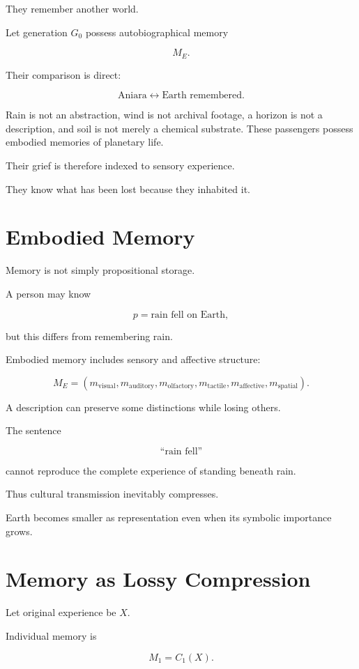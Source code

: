 \documentclass[11pt,oneside]{book}
\theoremstyle{definition}
\theoremstyle{remark}
\begin{document}
They remember another world.

Let generation \(G_0\) possess autobiographical memory

\[
M_E.
\]

Their comparison is direct:

\[
\text{Aniara}
\leftrightarrow
\text{Earth remembered}.
\]

Rain is not an abstraction, wind is not archival footage, a horizon is not a description, and soil is not merely a chemical substrate. These passengers possess embodied memories of planetary life.

Their grief is therefore indexed to sensory experience.

They know what has been lost because they inhabited it.

\section{Embodied Memory}

Memory is not simply propositional storage.

A person may know

\[
p=\text{rain fell on Earth},
\]

but this differs from remembering rain.

Embodied memory includes sensory and affective structure:

\[
M_E
=
(
m_{\mathrm{visual}},
m_{\mathrm{auditory}},
m_{\mathrm{olfactory}},
m_{\mathrm{tactile}},
m_{\mathrm{affective}},
m_{\mathrm{spatial}}
).
\]

A description can preserve some distinctions while losing others.

The sentence

\[
\text{``rain fell''}
\]

cannot reproduce the complete experience of standing beneath rain.

Thus cultural transmission inevitably compresses.

Earth becomes smaller as representation even when its symbolic importance grows.

\section{Memory as Lossy Compression}

Let original experience be \(X\).

Individual memory is

\[
M_1=C_1(X).
\]
\end{document}

